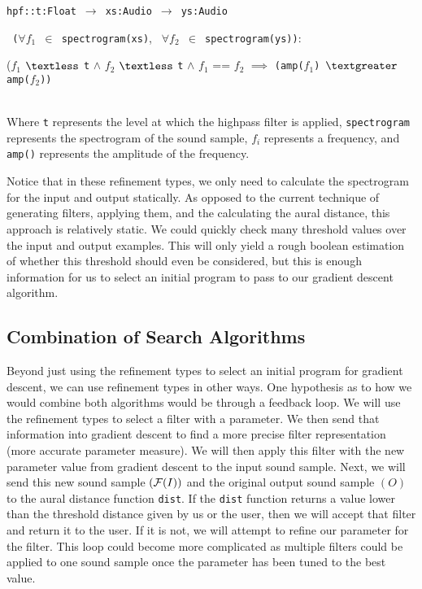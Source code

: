 \centerline{ \texttt{hpf::t:Float} $\,\to\,$  \texttt{xs:Audio} $\,\to\,$ \texttt{ys:Audio} \textbar }
\centerline{\texttt{ ($\forall$$f_1$ $\in$ spectrogram(xs)}, \texttt{ $\forall$$f_2$ $\in$ spectrogram(ys))}: } \centerline{($f_1$ $\textless$ \texttt{t}  $\land$  $f_2$ $\textless$ \texttt{t}  $\land$  $f_1$ == $f_2$ $\implies$ \texttt{(amp($f_1$) $\textgreater$ amp($f_2$))}} ~\\
Where \texttt{t} represents the level at which the highpass filter is applied, \texttt{spectrogram} represents the spectrogram of the sound sample, $f_i$ represents a frequency, and \texttt{amp()} represents the amplitude of the frequency. 

Notice that in these refinement types, we only need to calculate the spectrogram for the input and output statically.
As opposed to the current technique of generating filters, applying them, and the calculating the aural distance, this approach is relatively static.
We could quickly check many threshold values over the input and output examples. 
This will only yield a rough boolean estimation of whether this threshold should even be considered, but this is enough information for us to select an initial program to pass to our gradient descent algorithm.

\subsection{Combination of Search Algorithms}

Beyond just using the refinement types to select an initial program for gradient descent, we can use refinement types in other ways.
One hypothesis as to how we would combine both algorithms would be through a feedback loop.
We will use the refinement types to select a filter with a parameter.
We then send that information into gradient descent to find a more precise filter representation (more accurate parameter measure).
We will then apply this filter with the new parameter value from gradient descent to the input sound sample.
Next, we will send this new sound sample $(\mathcal{F}(I))$ and the original output sound sample $(O)$ to the aural distance function \texttt{dist}.
If the \texttt{dist} function returns a value lower than the threshold distance given by us or the user, then we will accept that filter and return it to the user.
If it is not, we will attempt to refine our parameter for the filter.
This loop could become more complicated as multiple filters could be applied to one sound sample once the parameter has been tuned to the best value.



